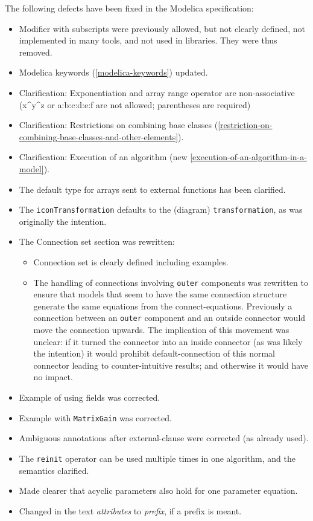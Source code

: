 The following defects have been fixed in the Modelica specification:
\begin{itemize}
\item
  Modifier with subscripts were previously allowed, but not clearly
  defined, not implemented in many tools, and not used in libraries.
  They were thus removed.
\item
  Modelica keywords (\cref{modelica-keywords}) updated.
\item
  Clarification: Exponentiation and array range operator are
  non-associative\\
  (x\^{}y\^{}z or a:b:c:d:e:f are not allowed; parentheses are required)
\item
  Clarification: Restrictions on combining base classes (\cref{restriction-on-combining-base-classes-and-other-elements}).
\item
  Clarification: Execution of an algorithm (new \cref{execution-of-an-algorithm-in-a-model}).
\item
  The default type for arrays sent to external functions has been
  clarified.
\item
  The \lstinline!iconTransformation! defaults to the (diagram)
  \lstinline!transformation!, as was originally the intention.
\item
  The Connection set section was rewritten:
  \begin{itemize}
  \item
    Connection set is clearly defined including examples.
  \item
    The handling of connections involving \lstinline!outer! components was rewritten to ensure that models that seem to have the same connection structure generate the same equations from the connect-equations.  Previously a connection between an \lstinline!outer! component and an outside connector would move the connection upwards.  The implication of this movement was unclear: if it turned the connector into an inside connector (as was likely the intention) it would prohibit default-connection of this normal connector leading to counter-intuitive results; and otherwise it would have no impact.
  \end{itemize}
\item
  Example of using fields was corrected.
\item
  Example with \lstinline!MatrixGain! was corrected.
\item
  Ambiguous annotations after external-clause were corrected (as already used).
\item
  The \lstinline!reinit! operator can be used multiple times in one algorithm, and the semantics clarified.
\item
  Made clearer that acyclic parameters also hold for one parameter
  equation.
\item
  Changed in the text \emph{attributes} to \emph{prefix}, if a prefix is
  meant.
\end{itemize}

